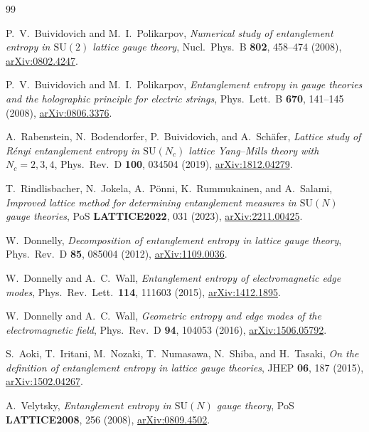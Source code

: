 \documentclass[11pt,a4paper]{article}
\theoremstyle{definition}
\begin{document}
\begin{thebibliography}{99}

P.~V.~Buividovich and M.~I.~Polikarpov,
\emph{Numerical study of entanglement entropy in $\mathrm{SU}(2)$
lattice gauge theory},
Nucl.\ Phys.\ B \textbf{802}, 458--474 (2008),
\href{https://arxiv.org/abs/0802.4247}{arXiv:0802.4247}.

P.~V.~Buividovich and M.~I.~Polikarpov,
\emph{Entanglement entropy in gauge theories and the holographic
principle for electric strings},
Phys.\ Lett.\ B \textbf{670}, 141--145 (2008),
\href{https://arxiv.org/abs/0806.3376}{arXiv:0806.3376}.

A.~Rabenstein, N.~Bodendorfer, P.~Buividovich, and A.~Sch\"afer,
\emph{Lattice study of R\'enyi entanglement entropy in
$\mathrm{SU}(N_{c})$ lattice Yang--Mills theory with $N_{c}=2,3,4$},
Phys.\ Rev.\ D \textbf{100}, 034504 (2019),
\href{https://arxiv.org/abs/1812.04279}{arXiv:1812.04279}.

T.~Rindlisbacher, N.~Jokela, A.~P\"onni, K.~Rummukainen, and
A.~Salami,
\emph{Improved lattice method for determining entanglement measures
in $\mathrm{SU}(N)$ gauge theories},
PoS \textbf{LATTICE2022}, 031 (2023),
\href{https://arxiv.org/abs/2211.00425}{arXiv:2211.00425}.

W.~Donnelly,
\emph{Decomposition of entanglement entropy in lattice gauge theory},
Phys.\ Rev.\ D \textbf{85}, 085004 (2012),
\href{https://arxiv.org/abs/1109.0036}{arXiv:1109.0036}.

W.~Donnelly and A.~C.~Wall,
\emph{Entanglement entropy of electromagnetic edge modes},
Phys.\ Rev.\ Lett.\ \textbf{114}, 111603 (2015),
\href{https://arxiv.org/abs/1412.1895}{arXiv:1412.1895}.

W.~Donnelly and A.~C.~Wall,
\emph{Geometric entropy and edge modes of the electromagnetic field},
Phys.\ Rev.\ D \textbf{94}, 104053 (2016),
\href{https://arxiv.org/abs/1506.05792}{arXiv:1506.05792}.

S.~Aoki, T.~Iritani, M.~Nozaki, T.~Numasawa, N.~Shiba, and H.~Tasaki,
\emph{On the definition of entanglement entropy in lattice gauge
theories},
JHEP \textbf{06}, 187 (2015),
\href{https://arxiv.org/abs/1502.04267}{arXiv:1502.04267}.

A.~Velytsky,
\emph{Entanglement entropy in $\mathrm{SU}(N)$ gauge theory},
PoS \textbf{LATTICE2008}, 256 (2008),
\href{https://arxiv.org/abs/0809.4502}{arXiv:0809.4502}.


\end{thebibliography}
\end{document}
